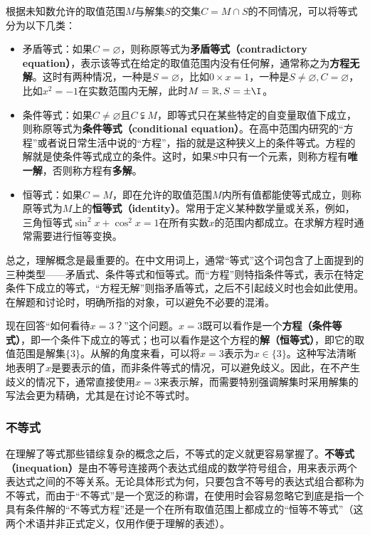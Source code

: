 根据未知数允许的取值范围$M$与解集$S$的交集$C=M\cap S$的不同情况，可以将等式分为以下几类：
\begin{itemize}
\item 矛盾等式：如果$C = \varnothing$，则称原等式为\textbf{矛盾等式（contradictory equation）}，表示该等式在给定的取值范围内没有任何解，通常称之为\textbf{方程无解}。这时有两种情况，一种是$S=\varnothing$，比如$0\times x=1$，一种是$S\neq\varnothing,C=\varnothing$，比如$x^2=-1$在实数范围内无解，此时$M=\mathbb{R},S={\pm \I}$。
\item 条件等式：如果$C \neq \varnothing$且$C \subsetneqq M$，即等式只在某些特定的自变量取值下成立，则称原等式为\textbf{条件等式（conditional equation）}。在高中范围内研究的“方程”或者说日常生活中说的“方程”，指的就是这种狭义上的条件等式。方程的解就是使条件等式成立的条件。这时，如果$S$中只有一个元素，则称方程有\textbf{唯一解}，否则称方程有\textbf{多解}。
\item 恒等式：如果$C = M$，即在允许的取值范围$M$内所有值都能使等式成立，则称原等式为$M$上的\textbf{恒等式（identity）}。常用于定义某种数学量或关系，例如，三角恒等式$\sin^2 x + \cos^2 x = 1$在所有实数$x$的范围内都成立。在求解方程时通常需要进行恒等变换。
\end{itemize}

总之，理解概念是最重要的。在中文用词上，通常“等式”这个词包含了上面提到的三种类型——矛盾式、条件等式和恒等式。而“方程”则特指条件等式，表示在特定条件下成立的等式，“方程无解”则指矛盾等式，之后不引起歧义时也会如此使用。在解题和讨论时，明确所指的对象，可以避免不必要的混淆。

现在回答“如何看待$x = 3$？”这个问题。$x = 3$既可以看作是一个\textbf{方程（条件等式）}，即一个条件下成立的等式；也可以看作是这个方程的\textbf{解（恒等式）}，即它的取值范围是解集$\{3\}$。从解的角度来看，可以将$x = 3$表示为$x \in \{3\}$。这种写法清晰地表明了$x$是要表示的值，而非条件等式的情况，可以避免歧义。因此，在不产生歧义的情况下，通常直接使用$x = 3$来表示解，而需要特别强调解集时采用解集的写法会更为精确，尤其是在讨论不等式时。

\subsubsection{不等式}

在理解了等式那些错综复杂的概念之后，不等式的定义就更容易掌握了。\textbf{不等式（inequation）}是由不等号连接两个表达式组成的数学符号组合，用来表示两个表达式之间的不等关系。无论具体形式为何，只要包含不等号的表达式组合都称为不等式，而由于“不等式”是一个宽泛的称谓，在使用时会容易忽略它到底是指一个具有条件解的“不等式方程”还是一个在所有取值范围上都成立的“恒等不等式”（这两个术语并非正式定义，仅用作便于理解的表述）。

